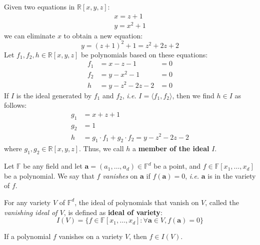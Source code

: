 \begin{Example}
Given two equations in $\mathbb{R}[x,y,z]$:
\begin{eqnarray}
x=z+1 \nonumber \\
y=x^2+1 \nonumber 
\end{eqnarray}
we can eliminate $x$ to obtain a new equation:
\begin{equation}
y=(z+1)^2+1=z^2+2z+2 \nonumber 
\end{equation}
Let $f_1, f_2, h \in \mathbb{R}[x,y,z]$ be polynomials based on these 
equations:
\begin{eqnarray}
f_1 &= x-z-1 &= 0 \nonumber \\
f_2 &= y-x^2-1 &= 0 \nonumber \\
h   &= y-z^2-2z-2 &= 0 \nonumber
\end{eqnarray}
If $I$ is the ideal generated by $f_1$ and $f_2$, {\it i.e.} 
$I=\langle f_1, f_2 \rangle$, then we find $h \in I$ as follows:
\begin{eqnarray}
g_1 &= x+z+1 \nonumber \\
g_2 &= 1     \nonumber \\
h &= g_1\cdot f_1+g_2\cdot f_2  = y-z^2-2z-2 \nonumber
\end{eqnarray}
where $g_1, g_2 \in \mathbb{R}[x,y,z]$.
Thus, we call $h$ a {\bf member of the ideal} $I$.
\end{Example}


Let $\mathbb{F}$ be any field and let $\mathbf{a}=(a_{1},\dots,a_{d}) \in \mathbb{F}^d$ be a point, and $f \in
\mathbb{F}[x_1,\dots, x_d]$ be a polynomial. We say that $f$ {\it vanishes} on $\mathbf{a}$ 
if $f(\mathbf{a}) = 0$, {\it i.e.} $\mathbf{a}$ is in the variety of $f$.

\begin{Definition}
For any variety $V$ of $\mathbb{F}^d$, the ideal of polynomials that vanish on $V$,
called the {\it vanishing ideal of $V$}, is defined as {\bf ideal of variety}:
$$I(V) = \{f\in
\mathbb{F}[x_1,\dots, x_d]: \forall \mathbf{a} \in V, f(\mathbf{a}) =
0\}$$ 
\end{Definition}

\begin{Proposition}\label{pro:iofv}
	If a polynomial $f$ vanishes on a variety $V$, then $f \in I(V)$. 
\end{Proposition}

